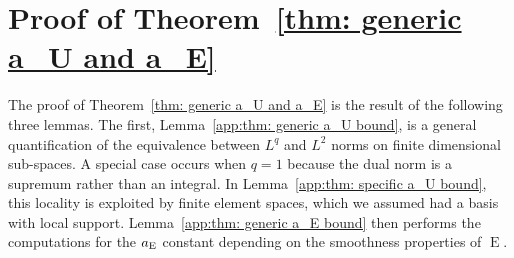 \documentclass[smallextended]{svjour3}
\newcommand{\op}[1]{\operatorname{#1}}
\newcommand{\1}{\F{1}}
\newcommand*{\vars}[1]{%
	\IfEqCase{#1}{%
		{0}{\alpha}%
		{1}{\beta}%
		{2}{\gamma}%
		{3}{a}%
		{4}{b}%
		{5}{c}%
	}[k#1]%
}
\begin{document}
	\section{Proof of \texorpdfstring{Theorem~\ref{thm: generic a_U and a_E}}{rates for general finite element spaces}}\label{app: generic a_U and a_E}
	The proof of Theorem~\ref{thm: generic a_U and a_E} is the result of the following three lemmas. The first, Lemma~\ref{app:thm: generic a_U bound}, is a general quantification of the equivalence between $L^q$ and $L^2$ norms on finite dimensional sub-spaces. A special case occurs when $q=1$ because the dual norm is a supremum rather than an integral. In Lemma~\ref{app:thm: specific a_U bound}, this locality is exploited by finite element spaces, which we assumed had a basis with local support. Lemma~\ref{app:thm: generic a_E bound} then performs the computations for the $\vars3_{\op{E}}$ constant depending on the smoothness properties of $\op{E}$.
	
\end{document}

